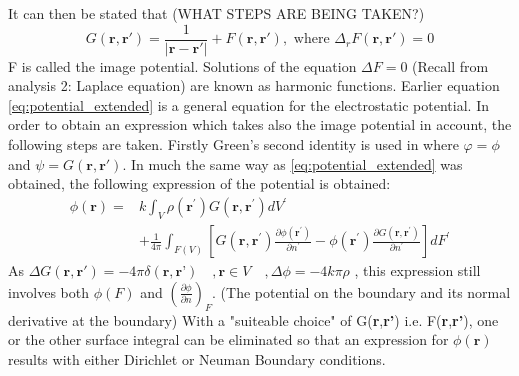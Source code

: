 It can then be stated that (WHAT STEPS ARE BEING TAKEN?)
\begin{equation}
    G(\textbf{r},\textbf{r}') = \frac{1}{|\textbf{r}-\textbf{r}'|} + F(\textbf{r},\textbf{r}'), \text{ where } \Delta_r F(\textbf{r},\textbf{r}') = 0
\end{equation}
F is called the image potential. Solutions of the equation $\displaystyle \Delta F = 0$ (Recall from analysis 2: Laplace equation) are known as harmonic functions. 
Earlier equation \ref{eq:potential_extended} is a general equation for the electrostatic potential. In order to obtain an expression which takes also the image potential in account, the following steps are taken.
Firstly Green's second identity is used in where $\varphi = \phi$ and $\psi = G(\textbf{r},\textbf{r}')$. 
In much the same way as \ref{eq:potential_extended} was obtained, the following expression of the potential is obtained:
\begin{equation}
    \begin{aligned}
    \phi(\mathbf{r})=& k \int_{V} \rho\left(\mathbf{r}^{\prime}\right) G\left(\mathbf{r}, \mathbf{r}^{\prime}\right) d V^{\prime} \\
    &+\frac{1}{4 \pi} \int_{F(V)}\left[G\left(\mathbf{r}, \mathbf{r}^{\prime}\right) \frac{\partial \phi\left(\mathbf{r}^{\prime}\right)}{\partial n^{\prime}}-\phi\left(\mathbf{r}^{\prime}\right) \frac{\partial G\left(\mathbf{r}, \mathbf{r}^{\prime}\right)}{\partial n^{\prime}}\right] d F^{\prime}
    \end{aligned}
\end{equation}
As $\Delta G(\textbf{r},\textbf{r}') = -4\pi \delta( \textbf{r},\textbf{r'} ) \quad , \textbf{r} \in V \quad , \Delta \phi = -4k\pi \rho $ , this expression still involves both $\phi(F)$ and $\displaystyle \left(\frac{\partial \phi}{\partial n} \right)_F$. (The potential on the boundary and its normal derivative at the boundary)
With a "suiteable choice" of G(\textbf{r},\textbf{r'}) i.e. F(\textbf{r},\textbf{r'}), one or the other surface integral can be eliminated so that an expression for $\phi(\textbf{r})$ results with either Dirichlet or Neuman Boundary conditions. 